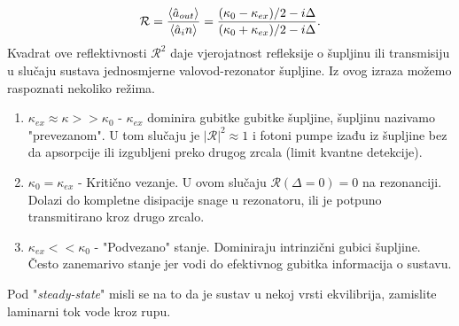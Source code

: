 \begin{equation}
	\mathcal{R} = \frac{\braket{\hat{a}_{out}}}{\braket{\hat{a}_in}} = \frac{(\kappa_0 -\kappa_{ex})/2 -i\Delta}{(\kappa_0 +\kappa_{ex})/2 -i\Delta}.
	\label{eq:8}
\end{equation}
Kvadrat ove reflektivnosti $\mathcal{R}^2$ daje vjerojatnost refleksije o šupljinu ili transmisiju u slučaju sustava jednosmjerne valovod-rezonator šupljine.
Iz ovog izraza možemo raspoznati nekoliko režima. 
\begin{enumerate}
	\item $\kappa_{ex} \approx \kappa >>\kappa_0$ - $\kappa_{ex}$ dominira gubitke gubitke šupljine, šupljinu nazivamo "prevezanom". U tom slučaju je $|\mathcal{R}|^2 \approx 1$ 
i fotoni pumpe izađu iz šupljine bez da apsorpcije ili izgubljeni preko drugog zrcala (limit kvantne detekcije).
	\item  $\kappa_0 = \kappa_{ex}$ - Kritično vezanje. U ovom slučaju $\mathcal{R} (\Delta = 0) = 0$ na rezonanciji. Dolazi do kompletne disipacije snage u rezonatoru, ili je potpuno transmitirano kroz drugo zrcalo.
	\item $\kappa_{ex} << \kappa_0$ - "Podvezano" stanje. Dominiraju intrinzični gubici šupljine. Često zanemarivo stanje jer vodi do efektivnog gubitka informacija o sustavu.
\end{enumerate}

\begin{Bilješka}
	Pod "\textit{steady-state}" misli se na to da je sustav u nekoj vrsti ekvilibrija, zamislite laminarni tok vode kroz rupu.
\end{Bilješka}
